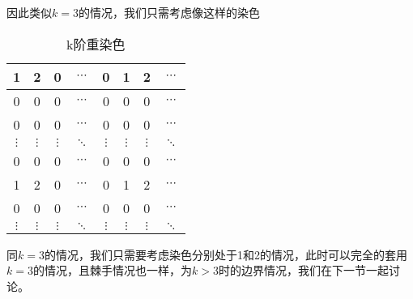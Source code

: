 因此类似$k=3$的情况，我们只需考虑像这样的染色

\begin{table}[h]
	\centering
	\caption{k阶重染色}
	\begin{tabular}{|c|c|c|c|c|c|c|c|}
		\hline
		1        & 2        & 0        & $\cdots$ & 0        & 1        & 2        & $\cdots$ \\
		\hline
		0        & 0        & 0        & $\cdots$ & 0        & 0        & 0        & $\cdots$ \\
		\hline
		0        & 0        & 0        & $\cdots$ & 0        & 0        & 0        & $\cdots$ \\
		\hline
		$\vdots$ & $\vdots$ & $\vdots$ & $\ddots$ & $\vdots$ & $\vdots$ & $\vdots$ & $\ddots$ \\
		\hline
		0        & 0        & 0        & $\cdots$ & 0        & 0        & 0        & $\cdots$ \\
		\hline
		1        & 2        & 0        & $\cdots$ & 0        & 1        & 2        & $\cdots$ \\
		\hline
		0        & 0        & 0        & $\cdots$ & 0        & 0        & 0        & $\cdots$ \\
		\hline
		$\vdots$ & $\vdots$ & $\vdots$ & $\ddots$ & $\vdots$ & $\vdots$ & $\vdots$ & $\ddots$ \\
		\hline
	\end{tabular}
	\label{fig:k-order-staining-last}
\end{table}

同$k=3$的情况，我们只需要考虑染色分别处于1和2的情况，此时可以完全的套用$k=3$的情况，且棘手情况也一样，为$k>3$时的边界情况，我们在下一节一起讨论。

\clearpage
